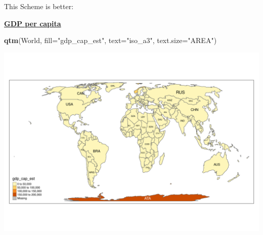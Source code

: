 \documentclass[
  ignorenonframetext,
]{beamer}
\newenvironment{Shaded}{\begin{snugshade}}{\end{snugshade}}
\newcommand{\DataTypeTok}[1]{\textcolor[rgb]{0.13,0.29,0.53}{#1}}
\newcommand{\KeywordTok}[1]{\textcolor[rgb]{0.13,0.29,0.53}{\textbf{#1}}}
\newcommand{\NormalTok}[1]{#1}
\newcommand{\StringTok}[1]{\textcolor[rgb]{0.31,0.60,0.02}{#1}}
\begin{document}
\begin{frame}[fragile]{This Scheme is better:}
\protect\hypertarget{this-scheme-is-better}{}
\begin{block}{\href{https://en.wikipedia.org/wiki/Population_density}{\textbf{GDP
per capita}}}
\protect\hypertarget{gdp-per-capita}{}
\begin{Shaded}
\begin{Highlighting}[]
\KeywordTok{qtm}\NormalTok{(World, }\DataTypeTok{fill=}\StringTok{"gdp\_cap\_est"}\NormalTok{, }\DataTypeTok{text=}\StringTok{"iso\_a3"}\NormalTok{, }
    \DataTypeTok{text.size=}\StringTok{"AREA"}\NormalTok{)}
\end{Highlighting}
\end{Shaded}

\includegraphics{quick_high_quality_maps_files/figure-beamer/unnamed-chunk-6-1.pdf}
\end{block}
\end{frame}
\end{document}
